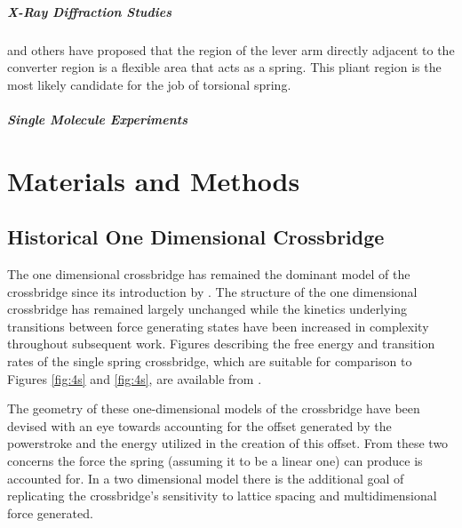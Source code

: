 \documentclass[]{article}
\begin{document}
\subparagraph*{X-Ray Diffraction Studies}

\cite{Houdusse:2001:p182} and others have proposed that the region of the lever arm directly adjacent to the converter region is a flexible area that acts as a spring. This pliant region is the most likely candidate for the job of torsional spring. 



\subparagraph*{Single Molecule Experiments}



\section*{Materials and Methods}  %

\subsection{Historical One Dimensional Crossbridge} %
\label{sub:historical_one_dimensional_crossbridge}


The one dimensional crossbridge has remained the dominant model of the crossbridge since its introduction by \citet{Huxley1957e}. 
The structure of the one dimensional crossbridge has remained largely unchanged while the kinetics underlying transitions between force generating states have been increased in complexity throughout subsequent work. \citep{PateCooke1988, Daniel1998a,Chase2004a,Tanner2007a}
Figures describing the free energy and transition rates of the single spring crossbridge, which are suitable for comparison to Figures \ref{fig:4s} and \ref{fig:4s}, are available from \citet{Tanner2007a}.

The geometry of these one-dimensional models of the crossbridge have been devised with an eye towards accounting for the offset generated by the powerstroke and the energy utilized in the creation of this offset. 
From these two concerns the force the spring (assuming it to be a linear one) can produce is accounted for. 
In a two dimensional model there is the additional goal of replicating the crossbridge's sensitivity to lattice spacing and multidimensional force generated. 
\end{document}
